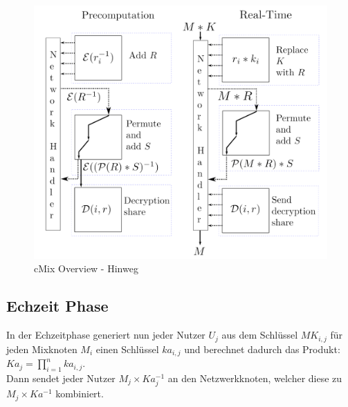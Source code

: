 \documentclass[
    fontsize=12pt,
    headings=small,
    parskip=half,           %
    bibliography=totoc,
    numbers=noenddot,       %
    open=any,               %
    ]{scrreprt}
\begin{document}
\begin{figure}[h]
\includegraphics[width=0.8
\textwidth]{Bilder/cmix_overview.png}
 \caption{cMix Overview - Hinweg} \label{graphic:overview}
\end{figure}

\subsection{Echzeit Phase}

In der Echzeitphase generiert nun jeder Nutzer $U_j$ aus dem Schlüssel $MK_{i,j}$
für jeden Mixknoten $M_i$ einen Schlüssel \(ka_{i,j}\) und berechnet dadurch das Produkt:
\(Ka_j = \prod_{i=1}^{n} ka_{i,j}\).\\
Dann sendet jeder Nutzer \(M_j \times Ka_j^{-1}\) an den Netzwerkknoten, welcher diese zu \(M_j \times Ka^{-1}\) kombiniert.
\end{document}
